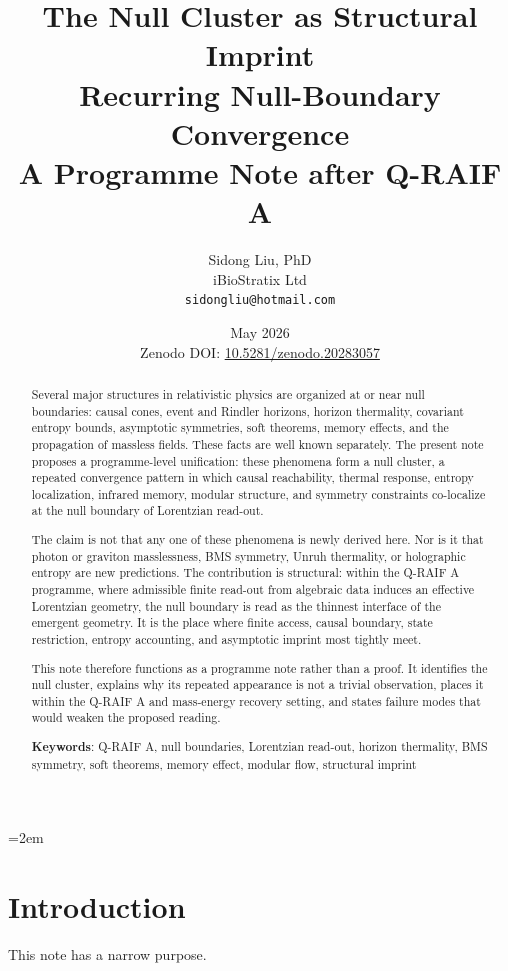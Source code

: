 \documentclass[12pt,a4paper]{article}
\title{%
  \textbf{The Null Cluster as Structural Imprint}\\
  \textbf{Recurring Null-Boundary Convergence}\\
  \large A Programme Note after Q-RAIF A%
}
\author{
  Sidong Liu, PhD \\
  \small iBioStratix Ltd \\
  \small \texttt{sidongliu@hotmail.com}
}
\date{May 2026\\
\small Zenodo DOI: \href{https://doi.org/10.5281/zenodo.20283057}{10.5281/zenodo.20283057}}
\theoremstyle{definition}
\theoremstyle{remark}
\begin{document}
\emergencystretch=2em
\raggedbottom
{}

\maketitle

\begin{abstract}
Several major structures in relativistic physics are organized at or near null boundaries: causal cones, event and Rindler horizons, horizon thermality, covariant entropy bounds, asymptotic symmetries, soft theorems, memory effects, and the propagation of massless fields. These facts are well known separately. The present note proposes a programme-level unification: these phenomena form a null cluster, a repeated convergence pattern in which causal reachability, thermal response, entropy localization, infrared memory, modular structure, and symmetry constraints co-localize at the null boundary of Lorentzian read-out.

The claim is not that any one of these phenomena is newly derived here. Nor is it that photon or graviton masslessness, BMS symmetry, Unruh thermality, or holographic entropy are new predictions. The contribution is structural: within the Q-RAIF A programme, where admissible finite read-out from algebraic data induces an effective Lorentzian geometry, the null boundary is read as the thinnest interface of the emergent geometry. It is the place where finite access, causal boundary, state restriction, entropy accounting, and asymptotic imprint most tightly meet.

This note therefore functions as a programme note rather than a proof. It identifies the null cluster, explains why its repeated appearance is not a trivial observation, places it within the Q-RAIF A and mass-energy recovery setting, and states failure modes that would weaken the proposed reading.

\medskip
\noindent\textbf{Keywords}: Q-RAIF A, null boundaries, Lorentzian read-out, horizon thermality, BMS symmetry, soft theorems, memory effect, modular flow, structural imprint
\end{abstract}

\clearpage
\tableofcontents
\clearpage
\section{Introduction}
\label{sec:introduction}

This note has a narrow purpose.
\end{document}
